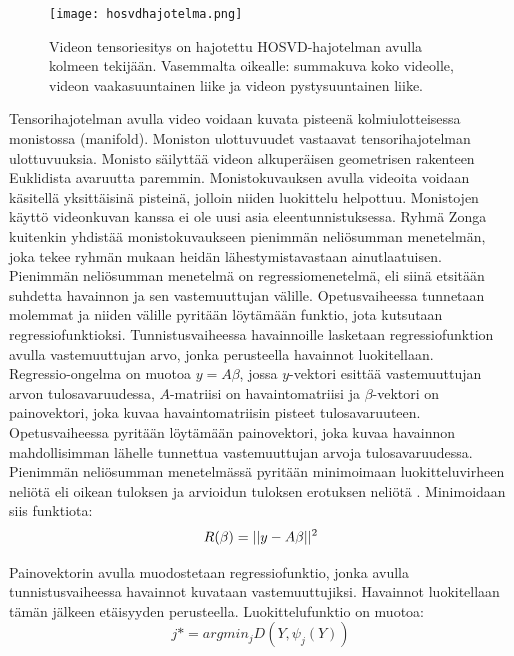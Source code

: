 \begin{figure}[htb]
  \begin{center}
    \texttt{[image: hosvdhajotelma.png]}
    \caption{Videon tensoriesitys on hajotettu HOSVD-hajotelman avulla kolmeen tekijään. Vasemmalta oikealle: summakuva koko videolle, videon vaakasuuntainen liike ja videon pystysuuntainen liike. \citep {6239180}}
    \label{fig:hosvdhajotelma}
  \end{center}
\end{figure}

Tensorihajotelman avulla video voidaan kuvata pisteenä kolmiulotteisessa monistossa (manifold). Moniston ulottuvuudet
vastaavat tensorihajotelman ulottuvuuksia. Monisto säilyttää videon 
alkuperäisen geometrisen rakenteen Euklidista avaruutta paremmin. \citep {Lui2012380} Monistokuvauksen avulla videoita voidaan käsitellä yksittäisinä
pisteinä, jolloin niiden luokittelu helpottuu. Monistojen käyttö videonkuvan kanssa ei ole uusi asia eleentunnistuksessa. 
Ryhmä Zonga kuitenkin yhdistää monistokuvaukseen pienimmän neliösumman menetelmän, joka tekee ryhmän mukaan heidän lähestymistavastaan
ainutlaatuisen.\citep {6239180}\\

Pienimmän neliösumman menetelmä on regressiomenetelmä, eli siinä etsitään suhdetta havainnon ja sen vastemuuttujan välille. 
Opetusvaiheessa tunnetaan molemmat ja niiden välille pyritään löytämään funktio, jota kutsutaan regressiofunktioksi.
Tunnistusvaiheessa havainnoille lasketaan regressiofunktion avulla vastemuuttujan arvo, jonka perusteella havainnot luokitellaan. \citep{leastsquares}\\

Regressio-ongelma on muotoa $y = A\beta$, jossa $y$-vektori esittää vastemuuttujan arvon tulosavaruudessa, $A$-matriisi on havaintomatriisi 
ja $\beta$-vektori on painovektori, joka kuvaa havaintomatriisin pisteet tulosavaruuteen.
Opetusvaiheessa pyritään löytämään painovektori, joka kuvaa havainnon mahdollisimman lähelle tunnettua vastemuuttujan arvoja
tulosavaruudessa. \citep {6239180} Pienimmän neliösumman menetelmässä pyritään minimoimaan luokitteluvirheen neliötä eli oikean tuloksen 
ja arvioidun tuloksen erotuksen neliötä \citep{leastsquares}.
Minimoidaan siis funktiota:
\begin{equation}
R(\beta) = ||y-A\beta||^2 \\
\end{equation}

Painovektorin avulla muodostetaan regressiofunktio, jonka avulla tunnistusvaiheessa havainnot kuvataan vastemuuttujiksi. 
Havainnot luokitellaan tämän jälkeen etäisyyden perusteella. Luokittelufunktio on muotoa:
\begin{equation}
j*=argmin_{j}D(Y,\psi_{j}(Y))
\end{equation}

